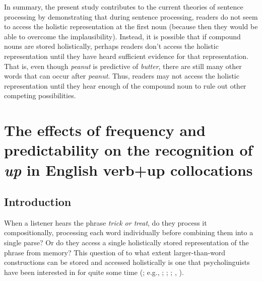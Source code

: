 \documentclass[
  12pt,
  letterpaper,
]{scrreprt}
\begin{document}
In summary, the present study contributes to the current theories of
sentence processing by demonstrating that during sentence processing,
readers do not seem to access the holistic representation at the first
noun (because then they would be able to overcome the implausibility).
Instead, it is possible that if compound nouns are stored holistically,
perhaps readers don't access the holistic representation until they have
heard sufficient evidence for that representation. That is, even though
\emph{peanut} is predictive of \emph{butter}, there are still many other
words that can occur after \emph{peanut}. Thus, readers may not access
the holistic representation until they hear enough of the compound noun
to rule out other competing possibilities.


\chapter{\texorpdfstring{The effects of frequency and predictability on
the recognition of \emph{up} in English verb+up
collocations}{The effects of frequency and predictability on the recognition of up in English verb+up collocations}}\label{the-effects-of-frequency-and-predictability-on-the-recognition-of-up-in-english-verbup-collocations}

\section{Introduction}\label{introduction-2}

When a listener hears the phrase \emph{trick or treat}, do they process
it compositionally, processing each word individually before combining
them into a single parse? Or do they access a single holistically stored
representation of the phrase from memory? This question of to what
extent larger-than-word constructions can be stored and accessed
holistically is one that psycholinguists have been interested in for
quite some time (; e.g.,
;
;
; ,
).
\end{document}
